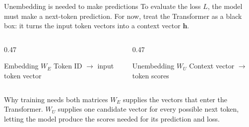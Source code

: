 \begin{frame}{Unembedding is needed to make predictions}
  \small
  To evaluate the loss \(L\), the model must make a next-token prediction.
  For now, treat the Transformer as a black box: it turns the input token
  vectors into a context vector \(\mathbf h\).

  \begin{center}
  \end{center}

  \begin{columns}[T]
    \begin{column}{0.47\textwidth}
      \begin{block}{Embedding \(W_E\)}
        Token ID \(\longrightarrow{}\) input token vector
      \end{block}
    \end{column}
    \begin{column}{0.47\textwidth}
      \begin{block}{Unembedding \(W_U\)}
        Context vector \(\longrightarrow{}\) token scores
      \end{block}
    \end{column}
  \end{columns}

  \begin{alertblock}{Why training needs both matrices}
    \(W_E\) supplies the vectors that enter the Transformer. \(W_U\) supplies
    one candidate vector for every possible next token, letting the model
    produce the scores needed for its prediction and loss.
  \end{alertblock}
\end{frame}

